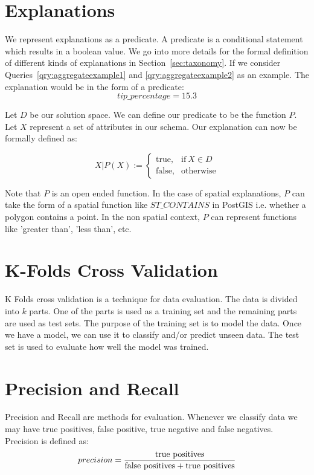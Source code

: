\section{Explanations}
We represent explanations as a predicate. A predicate is a conditional statement which results in a boolean value. We go into more details for the formal definition of different kinds of explanations in Section~\ref{sec:taxonomy}. If we consider Queries~\ref{qry:aggregateexample1} and \ref{qry:aggregateexample2} as an example. The explanation would be in the form of a predicate:
$$tip\_percentage = 15.3$$

Let $D$ be our solution space. We can define our predicate to be the function $P$. Let $X$ represent a set of attributes in our schema. Our explanation can now be formally defined as:

\begin{equation}
X|P(X):=
    \begin{cases}
      \text{true}, & \text{if}\ X \in D \\
      \text{false}, & \text{otherwise}
    \end{cases}
\end{equation}

Note that $P$ is an open ended function. In the case of spatial explanations, $P$ can take the form of a spatial function like $ST\_CONTAINS$ in PostGIS i.e. whether a polygon contains a point. In the non spatial context, $P$ can represent functions like 'greater than', 'less than', etc.

\section{K-Folds Cross Validation}
K Folds cross validation is a technique for data evaluation\citep{kohavi1995study,refaeilzadeh2009cross}. The data is divided into $k$ parts. One of the parts is used as a training set and the remaining parts are used as test sets. The purpose of the training set is to model the data. Once we have a model, we can use it to classify and/or predict unseen data. The test set is used to evaluate how well the model was trained.

\section{Precision and Recall}
Precision and Recall are methods for evaluation\citep{olson2008advanced,powers2011evaluation}. Whenever we classify data we may have true positives, false positive, true negative and false negatives. Precision is defined as:
$$precision = \frac{\textnormal{true positives}}{\textnormal{false positives} + \textnormal{true positives}}$$

